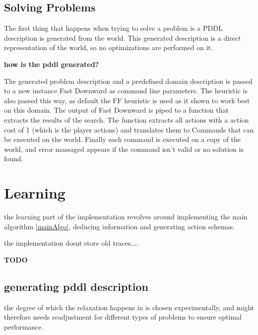 	\subsection{Solving Problems}
	The first thing that happens when trying to solve a problem is a PDDL description is generated from the world. This generated description is a direct representation of the world, so no optimizations are performed on it.
	
	\textbf{\huge how is the pddl generated?}

	The generated problem description and a predefined domain description is passed to a new instance Fast Downward as command line parameters. The heuristic is also passed this way, as default the FF heuristic is used as it shown to work best on this domain. The output of Fast Downward is piped to a function that extracts the results of the search. The function extracts all actions with a action cost of 1 (which is the player actions) and translates them to Commands that can be executed on the world. Finally each command is executed on a copy of the world, and error massaged appears if the command isn't valid or no solution is found. 
	
\section{Learning}
	the learning part of the implementation revolves around implementing the main algorithm \ref{mainAlgo}, deducing information and generating action schemas.
	
	the implementation dosnt store old traces....
	
	\textbf{\huge TODO}
	
	
	\subsection{generating pddl description}
	the degree of which the relaxation happens in is chosen experimentally, and might therefore needs readjustment for different types of problems to ensure optimal performance.
	